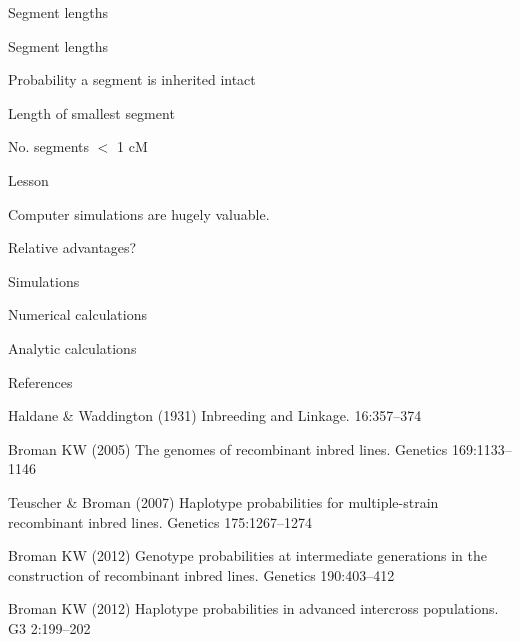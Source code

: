 \documentclass[aspectratio=169,12pt,t]{beamer}
\begin{document}
\begin{frame}[c]{Segment lengths}
\end{frame}

\begin{frame}[c]{Segment lengths}
\end{frame}

\begin{frame}[c]{Probability a segment is inherited intact}
\end{frame}

\begin{frame}[c]{Length of smallest segment}
\end{frame}

\begin{frame}[c]{No. segments $<$ 1 cM}
\end{frame}




\begin{frame}[c]{Lesson}

  \centerline{\large Computer simulations are hugely valuable.}

\end{frame}



\begin{frame}[c]{Relative advantages?}

    \bbi
    \item Simulations
    \item Numerical calculations
    \item Analytic calculations
    \ei

\end{frame}




\begin{frame}[c]{References}

  \bbi

  \item Haldane \& Waddington (1931) Inbreeding and Linkage.
    16:357--374

  \item Broman KW (2005) The genomes of recombinant inbred lines. Genetics 169:1133--1146

  \item Teuscher \& Broman (2007) Haplotype probabilities for
    multiple-strain recombinant inbred lines. Genetics 175:1267--1274

  \item Broman KW (2012) Genotype probabilities at intermediate
    generations in the construction of recombinant inbred lines.
    Genetics 190:403--412

  \item Broman KW (2012) Haplotype probabilities in advanced
    intercross populations. G3 2:199--202

  \ei

\end{frame}
\end{document}
